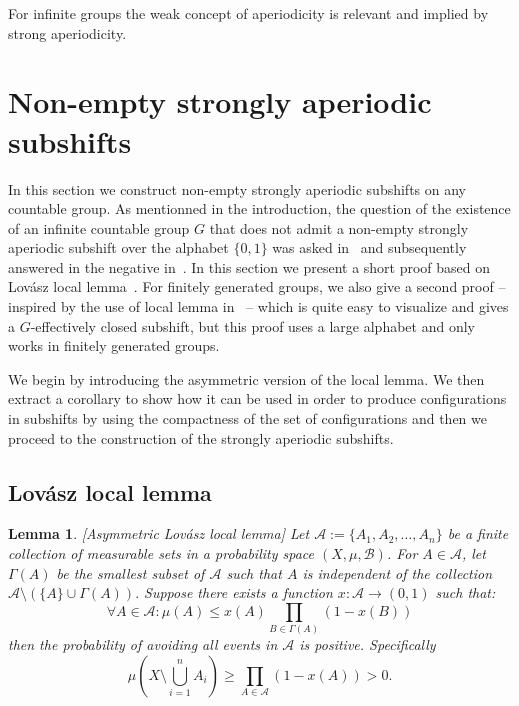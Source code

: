 \documentclass[letterpaper]{article}
\theoremstyle{plain}
\newtheorem{lemma}[theorem]{Lemma}
\newcommand{\cor}[2][]{#2}
\begin{document}
	For infinite groups the weak concept of aperiodicity is relevant and implied by strong aperiodicity.
	
	
	\section{Non-empty strongly aperiodic subshifts}
	\label{section.strongly_aperiodic_subshifts}
	
	In this section we construct non-empty strongly aperiodic subshifts on any countable group. \cor{As mentionned in the introduction,} \cor[T]{t}he question of the existence of an infinite countable group $G$ that does not admit a non-empty strongly aperiodic subshift over the alphabet $\{0,1\}$ was asked in~\cite{glasner2009} and subsequently answered in the negative in~\cite{gao2009}. \cor[The proof presented in the latter article is a technical construction.]{} In this section we present a short proof based on Lov\'asz local lemma~\cite{AlonSpencer2008}. \cor[We]{For finitely generated groups, we also} give a second proof -- inspired by the use of local lemma in~\cite{alonetal_nonrepetitivecoloringofgraphs} -- which is quite easy to visualize and gives a $G$-effectively closed subshift, but this proof uses a large alphabet and only works in finitely generated groups.
	
	We begin by introducing the asymmetric version of the local lemma. We then extract a corollary to show how it can be used in order to produce configurations in subshifts by using the compactness of the set of configurations and then we proceed to the construction of the strongly aperiodic subshifts.
	
	\subsection{Lov\'asz local lemma}
	\label{subsection.LLL}

	\begin{lemma}\label{lovaszlocallemma}[Asymmetric Lov\'asz local lemma]
		Let $\mathscr{A} := \{A_1,A_2,\dots,A_n\}$ be a finite collection of measurable sets in a probability space $(X,\mu, \mathcal{B})$. For $A \in \mathscr{A}$, let $\Gamma(A)$ be the \cor{smallest} subset of $\mathscr{A}$ such that $A$ is independent of the collection $\mathscr{A} \setminus (\{A\} \cup \Gamma(A)).$ Suppose there exists a function $x: \mathscr{A} \to (0,1)$ such that: $$\forall A \in \mathscr{A}: \mu(A) \leq x(A)\prod_{B \in \Gamma(A)}(1-x(B))$$ then the probability of avoiding all events in $\mathscr{A}$ is positive\cor[, in particular:]{. Specifically} $$ \mu\left(  X \setminus \bigcup_{i = 1}^{n} {A_i}\right) \geq \prod_{A \in \mathscr{A}}(1-x(A)) > 0.$$
	\end{lemma}
	
\end{document}
